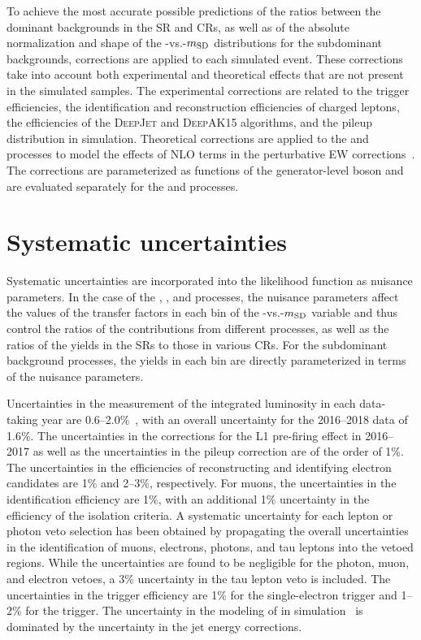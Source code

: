 To achieve the most accurate possible predictions of the ratios between the dominant backgrounds in the SR and CRs, as well as of the absolute normalization and shape of the \recoil-vs.-$m_{\mathrm{SD}}$ distributions for the subdominant backgrounds, corrections are applied to each simulated event. These corrections take into account both experimental and theoretical effects that are not present in the simulated samples. The experimental corrections are related to the trigger efficiencies, the identification and reconstruction efficiencies of charged leptons, the efficiencies of the \textsc{DeepJet} and \textsc{DeepAK15} algorithms, and the pileup distribution in simulation. Theoretical corrections are applied to the \Zjets and \Wjets processes to model the effects of NLO terms in the perturbative EW corrections~\cite{DMTheory}. The corrections are parameterized as functions of the generator-level boson \pt and are evaluated separately for the \Wjets and \Zjets processes.


\section{Systematic uncertainties}

Systematic uncertainties are incorporated into the likelihood function as nuisance parameters. In the case of the \Zjets, \Wjets, and \ttbar processes, the nuisance parameters affect the values of the transfer factors in each bin of the \recoil-vs.-$m_{\mathrm{SD}}$ variable and thus control the ratios of the contributions from different processes, as well as the ratios of the yields in the SRs to those in various CRs. For the subdominant background processes, the yields in each bin are directly parameterized in terms of the nuisance parameters. 

Uncertainties in the measurement of the integrated luminosity in each data-taking year are 0.6--2.0\%~\cite{CMS:2021xjt,CMS-PAS-LUM-17-004,CMS-PAS-LUM-18-002}, with an overall uncertainty for the 2016--2018 data of 1.6\%. The uncertainties in the corrections for the L1 pre-firing effect in 2016--2017 as well as the uncertainties in the pileup correction are of the order of 1\%.
The uncertainties in the efficiencies of reconstructing and identifying electron candidates are 1\% and 2--3\%, respectively. For muons, the uncertainties in the identification efficiency are 1\%, with an additional 1\% uncertainty in the efficiency of the isolation criteria.
A systematic uncertainty for each lepton or photon veto selection has been obtained by propagating the overall uncertainties in the identification of muons, electrons, photons, and tau leptons into the vetoed regions. While the uncertainties are found to be negligible for the photon, muon, and electron vetoes, a 3\% uncertainty in the tau lepton veto is included.
The uncertainties in the trigger efficiency are 1\% for the single-electron trigger and 1--2\% for the \ptmiss trigger.
The uncertainty in the modeling of \ptmiss in simulation~\cite{Khachatryan:2014gga} is dominated by the uncertainty in the jet energy corrections. 


